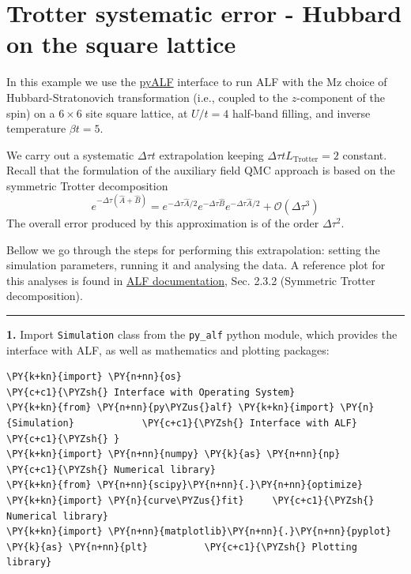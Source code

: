     
    

    
    \hypertarget{trotter-systematic-error---hubbard-on-the-square-lattice}{%
\section{Trotter systematic error - Hubbard on the square
lattice}\label{trotter-systematic-error---hubbard-on-the-square-lattice}}

    In this example we use the
\href{https://git.physik.uni-wuerzburg.de/ALF/pyALF/-/tree/ALF-2.2}{pyALF}
interface to run ALF with the Mz choice of Hubbard-Stratonovich
transformation (i.e., coupled to the \(z\)-component of the spin) on a
\(6\times 6\) site square lattice, at \(U/t=4\) half-band filling, and
inverse temperature \(\beta t = 5\).

We carry out a systematic \(\Delta \tau t\) extrapolation keeping
\(\Delta \tau t L_\text{Trotter} = 2\) constant. Recall that the
formulation of the auxiliary field QMC approach is based on the
symmetric Trotter decomposition \[
e^{ -\Delta \tau \left( \hat{A} + \hat{B} \right) }  =  e^{ -\Delta \tau \hat{A}/2}  e^{ -\Delta \tau  \hat{B}  }   e^{ -\Delta \tau \hat{A}/2}  +  \mathcal{O} \left (\Delta  \tau^3\right)
\] The overall error produced by this approximation is of the order
\(\Delta \tau^2\).

Bellow we go through the steps for performing this extrapolation:
setting the simulation parameters, running it and analysing the data. A
reference plot for this analyses is found in
\href{https://git.physik.uni-wuerzburg.de/ALF/ALF/-/blob/ALF-2.2/Documentation/doc.pdf}{ALF
documentation}, Sec. 2.3.2 (Symmetric Trotter decomposition).

\begin{center}\rule{0.5\linewidth}{0.5pt}\end{center}

\textbf{1.} Import \texttt{Simulation} class from the \texttt{py\_alf}
python module, which provides the interface with ALF, as well as
mathematics and plotting packages:

    \begin{tcolorbox}[breakable, size=fbox, boxrule=1pt, pad at break*=1mm,colback=cellbackground, colframe=cellborder]
\begin{Verbatim}[commandchars=\\\{\}]
\PY{k+kn}{import} \PY{n+nn}{os}                                \PY{c+c1}{\PYZsh{} Interface with Operating System}
\PY{k+kn}{from} \PY{n+nn}{py\PYZus{}alf} \PY{k+kn}{import} \PY{n}{Simulation}            \PY{c+c1}{\PYZsh{} Interface with ALF}
\PY{c+c1}{\PYZsh{} }
\PY{k+kn}{import} \PY{n+nn}{numpy} \PY{k}{as} \PY{n+nn}{np}                       \PY{c+c1}{\PYZsh{} Numerical library}
\PY{k+kn}{from} \PY{n+nn}{scipy}\PY{n+nn}{.}\PY{n+nn}{optimize} \PY{k+kn}{import} \PY{n}{curve\PYZus{}fit}     \PY{c+c1}{\PYZsh{} Numerical library}
\PY{k+kn}{import} \PY{n+nn}{matplotlib}\PY{n+nn}{.}\PY{n+nn}{pyplot} \PY{k}{as} \PY{n+nn}{plt}          \PY{c+c1}{\PYZsh{} Plotting library}
\end{Verbatim}
\end{tcolorbox}

